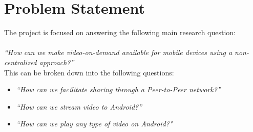 \section{Problem Statement}
The project is focused on answering the following main research question:\\
\\
\textit{``How can we make video-on-demand available for mobile devices using a non-centralized approach?''}\\

This can be broken down into the following questions:

\begin{itemize}
	\item\textit{``How can we facilitate sharing through a Peer-to-Peer network?''}
	\item\textit{``How can we stream video to Android?''}
	\item\textit{``How can we play any type of video on Android?"}
\end{itemize}
